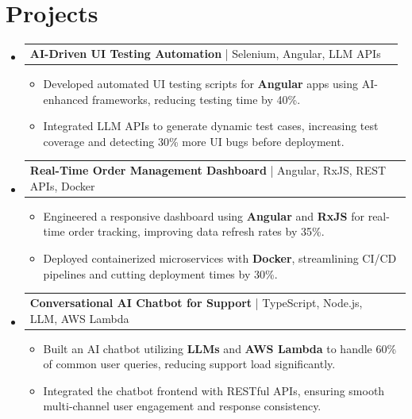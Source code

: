 \documentclass[letterpaper,11pt]{article}
\makeatletter
\newcommand{\resumeItem}[1]{
  \item\footnotesize{
    {#1 \vspace{-2pt}}
  }
}
\newcommand{\resumeProjectHeading}[2]{
    \item
    \begin{tabular*}{1.001\textwidth}{l@{\extracolsep{\fill}}r}
      \small#1 & \textbf{\small #2}\\
    \end{tabular*}\vspace{-7pt}
}
\newcommand{\resumeSubHeadingListStart}{\begin{itemize}[leftmargin=0pt, label={}]}
\newcommand{\resumeSubHeadingListEnd}{\end{itemize}}
\newcommand{\resumeItemListStart}{\begin{itemize}[leftmargin=*]}
\newcommand{\resumeItemListEnd}{\end{itemize}\vspace{-5pt}}
\makeatother
\begin{document}
\section{Projects}
    \vspace{-5pt}
    \resumeSubHeadingListStart
      \resumeProjectHeading
          {\textbf{AI-Driven UI Testing Automation} | Selenium, Angular, LLM APIs}{}
          \resumeItemListStart
              \resumeItem{Developed automated UI testing scripts for \textbf{Angular} apps using AI-enhanced frameworks, reducing testing time by 40\%.}
              \resumeItem{Integrated LLM APIs to generate dynamic test cases, increasing test coverage and detecting 30\% more UI bugs before deployment.}
          \resumeItemListEnd
          \vspace{-12pt}
      \resumeProjectHeading
          {\textbf{Real-Time Order Management Dashboard} | Angular, RxJS, REST APIs, Docker}{}
          \resumeItemListStart
              \resumeItem{Engineered a responsive dashboard using \textbf{Angular} and \textbf{RxJS} for real-time order tracking, improving data refresh rates by 35\%.}
              \resumeItem{Deployed containerized microservices with \textbf{Docker}, streamlining CI/CD pipelines and cutting deployment times by 30\%.}
          \resumeItemListEnd
          \vspace{-12pt}
      \resumeProjectHeading
          {\textbf{Conversational AI Chatbot for Support} | TypeScript, Node.js, LLM, AWS Lambda}{}
          \resumeItemListStart
              \resumeItem{Built an AI chatbot utilizing \textbf{LLMs} and \textbf{AWS Lambda} to handle 60\% of common user queries, reducing support load significantly.}
              \resumeItem{Integrated the chatbot frontend with RESTful APIs, ensuring smooth multi-channel user engagement and response consistency.}
          \resumeItemListEnd 
    \resumeSubHeadingListEnd
\end{document}
